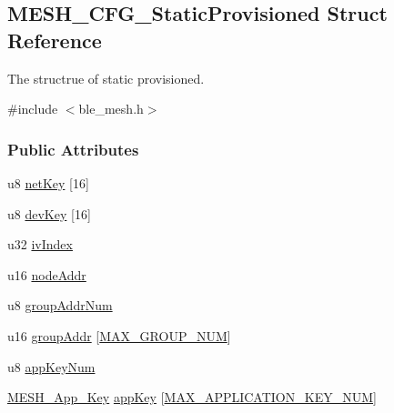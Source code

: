 \hypertarget{struct_m_e_s_h___c_f_g___static_provisioned}{}\subsection{M\+E\+S\+H\+\_\+\+C\+F\+G\+\_\+\+Static\+Provisioned Struct Reference}
\label{struct_m_e_s_h___c_f_g___static_provisioned}


The structrue of static provisioned.  




{\ttfamily \#include $<$ble\+\_\+mesh.\+h$>$}

\subsubsection*{Public Attributes}
\begin{DoxyCompactItemize}
\item 
u8 \hyperlink{struct_m_e_s_h___c_f_g___static_provisioned_ac316ec1a5fa96e2de96ad4b8a1b8ebca}{net\+Key} \mbox{[}16\mbox{]}
\item 
u8 \hyperlink{struct_m_e_s_h___c_f_g___static_provisioned_a6b64ea6617ec7eab4cc9cd521057625a}{dev\+Key} \mbox{[}16\mbox{]}
\item 
u32 \hyperlink{struct_m_e_s_h___c_f_g___static_provisioned_ad1cbb8c19831d7e1d8133dcc95f42450}{iv\+Index}
\item 
u16 \hyperlink{struct_m_e_s_h___c_f_g___static_provisioned_a9127712e4b5f1cab15cb1ee1b3633bb7}{node\+Addr}
\item 
u8 \hyperlink{struct_m_e_s_h___c_f_g___static_provisioned_a2e01143aed081451e0bc2b325ab8e8c3}{group\+Addr\+Num}
\item 
u16 \hyperlink{struct_m_e_s_h___c_f_g___static_provisioned_a792f056ec1da46eee74c64e1ffd7751b}{group\+Addr} \mbox{[}\hyperlink{group___m_e_s_h___g_r_o_u_p___n_u_m_ga4c4e392ad838b407e834d8fc117f797c}{M\+A\+X\+\_\+\+G\+R\+O\+U\+P\+\_\+\+N\+UM}\mbox{]}
\item 
u8 \hyperlink{struct_m_e_s_h___c_f_g___static_provisioned_aec68c22f4ba5e4f39820cb642cfda013}{app\+Key\+Num}
\item 
\hyperlink{struct_m_e_s_h___app___key}{M\+E\+S\+H\+\_\+\+App\+\_\+\+Key} \hyperlink{struct_m_e_s_h___c_f_g___static_provisioned_a17af6c8dcd7688cdbcce0866c7b3f35f}{app\+Key} \mbox{[}\hyperlink{group___m_e_s_h___a_p_p___k_e_y___n_u_m_gac77a9999095f79330fc88bf8a24a1dc7}{M\+A\+X\+\_\+\+A\+P\+P\+L\+I\+C\+A\+T\+I\+O\+N\+\_\+\+K\+E\+Y\+\_\+\+N\+UM}\mbox{]}
\end{DoxyCompactItemize}


